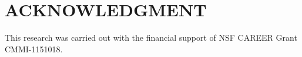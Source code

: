 \documentclass[US letter, 9 pt, conference]{ieeeconf}  \usepackage{setspace}
\begin{document}
\section*{ACKNOWLEDGMENT}

This research was carried out with the financial support of NSF CAREER Grant CMMI-1151018.







\end{document}
